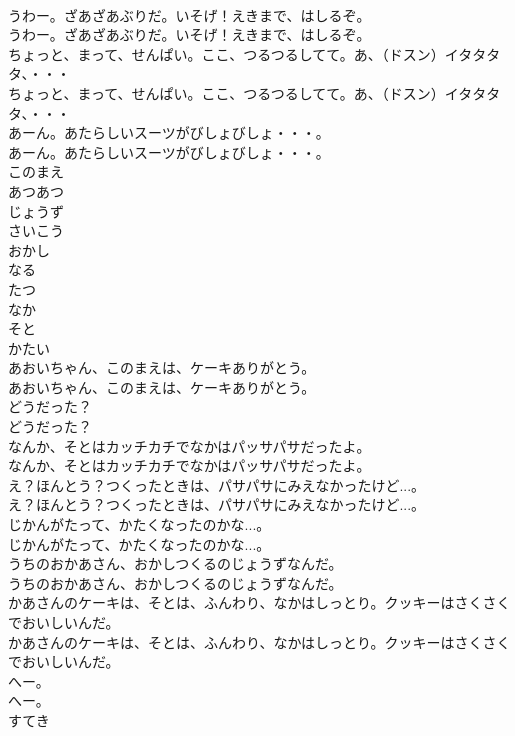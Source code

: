 \documentclass[8pt]{extreport}
\begin{document}
\begin{CJK}{UTF8}{min}
\\	うわー。ざあざあぶりだ。いそげ！えきまで、はしるぞ。	
\\	うわー。ざあざあぶりだ。いそげ！えきまで、はしるぞ。 
\\	ちょっと、まって、せんぱい。ここ、つるつるしてて。あ、（ドスン）イタタタタ、・・・	
\\	ちょっと、まって、せんぱい。ここ、つるつるしてて。あ、（ドスン）イタタタタ、・・・ 
\\	あーん。あたらしいスーツがびしょびしょ・・・。	
\\	あーん。あたらしいスーツがびしょびしょ・・・。 
\\	このまえ
\\	あつあつ
\\	じょうず
\\	さいこう
\\	おかし
\\	なる
\\	たつ
\\	なか
\\	そと
\\	かたい
\\	あおいちゃん、このまえは、ケーキありがとう。	
\\	あおいちゃん、このまえは、ケーキありがとう。 
\\	どうだった？	
\\	どうだった？ 
\\	なんか、そとはカッチカチでなかはパッサパサだったよ。	
\\	なんか、そとはカッチカチでなかはパッサパサだったよ。 
\\	え？ほんとう？つくったときは、パサパサにみえなかったけど...。	
\\	え？ほんとう？つくったときは、パサパサにみえなかったけど...。 
\\	じかんがたって、かたくなったのかな...。	
\\	じかんがたって、かたくなったのかな...。 
\\	うちのおかあさん、おかしつくるのじょうずなんだ。	
\\	うちのおかあさん、おかしつくるのじょうずなんだ。 
\\	かあさんのケーキは、そとは、ふんわり、なかはしっとり。クッキーはさくさくでおいしいんだ。	
\\	かあさんのケーキは、そとは、ふんわり、なかはしっとり。クッキーはさくさくでおいしいんだ。 
\\	へー。	
\\	へー。 
\\	すてき

\end{CJK}
\end{document}
